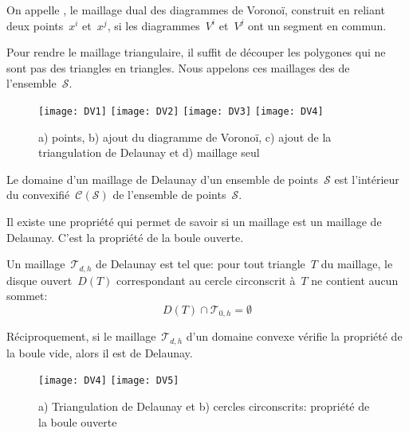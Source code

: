 \begin{definition}
On appelle , le maillage dual des diagrammes de Voronoï, construit en reliant deux points~$x^i$ et~$x^j$, si les diagrammes~$V^i$ et~$V^j$ ont un segment en commun.

Pour rendre le maillage triangulaire, il suffit de découper les polygones qui ne sont pas des triangles en triangles. Nous appelons ces maillages des  de l'ensemble~$\mathcal{S}$.
\end{definition}
\begin{figure}[htb]
\begin{center}
\texttt{[image: DV1]} \hspace{1em} \texttt{[image: DV2]} \hspace{1em} \texttt{[image: DV3]} \hspace{1em} \texttt{[image: DV4]}
\end{center}
\caption{a) points, b) ajout du diagramme de Voronoï, c) ajout de la triangulation de Delaunay et d) maillage seul}
\end{figure}

Le domaine d'un maillage de Delaunay d'un ensemble de points~$\mathcal{S}$ est l'intérieur du convexifié~$\mathcal{C(S)}$ de l'ensemble de points~$\mathcal{S}$.

\medskip
Il existe une propriété qui permet de savoir si un maillage est un maillage de Delaunay. C'est la propriété de la boule ouverte.
\begin{theoreme}
Un maillage~$\mathcal{T}_{d,h}$ de Delaunay est tel que: pour tout triangle~$T$ du maillage, le disque ouvert~$D(T)$ correspondant au cercle circonscrit à~$T$ ne contient
aucun sommet:
\begin{equation}
D(T) \cap \mathcal{T}_{0,h} = \emptyset
\end{equation}

Réciproquement, si le maillage~$\mathcal{T}_{d,h}$ d'un domaine convexe vérifie la propriété de la boule vide, alors il est de Delaunay.
\end{theoreme}
\begin{figure}[htb]
\begin{center}
 \texttt{[image: DV4]} \hspace{1em} \texttt{[image: DV5]}
\end{center}
\caption{a) Triangulation de Delaunay et b) cercles circonscrits: propriété de la boule ouverte}
\end{figure}

